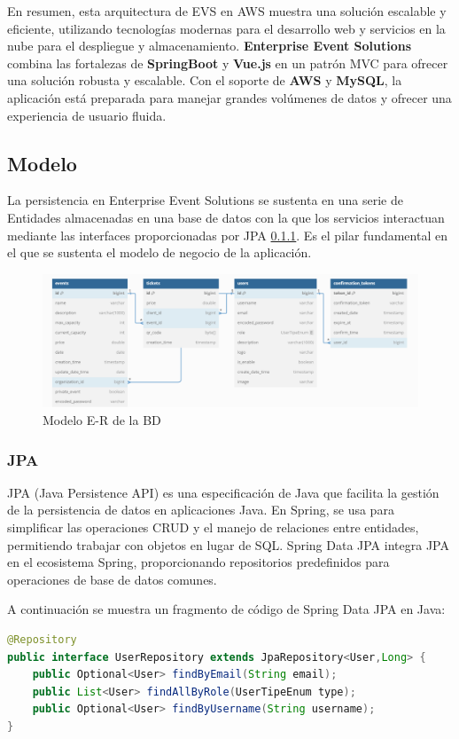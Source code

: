 En resumen, esta arquitectura de EVS en AWS muestra una solución escalable y eficiente, utilizando tecnologías modernas para el desarrollo web y servicios en la nube para el despliegue y almacenamiento. 
\textbf{Enterprise Event Solutions} combina las fortalezas de \textbf{SpringBoot} y \textbf{Vue.js} en un patrón MVC para ofrecer una solución robusta y 
escalable. Con el soporte de \textbf{AWS} y \textbf{MySQL}, la aplicación está preparada para manejar grandes volúmenes de datos y ofrecer una experiencia 
de usuario fluida.

\subsection{Modelo}
La persistencia en Enterprise Event Solutions se sustenta en una serie de Entidades almacenadas en una base de datos con la que los servicios interactuan mediante
las interfaces proporcionadas por JPA \ref{sec:jpa}. Es el pilar fundamental en el que se sustenta el modelo de negocio de la aplicación.
\begin{figure}[h]
    \centering
    \includegraphics[width=1.0\textwidth]{EVSdiagra.png} 
    \caption{Modelo E-R de la BD}
    \label{fig:diagramaBD}
\end{figure}

\subsubsection{JPA}
\label{sec:jpa}

JPA (Java Persistence API) es una especificación de Java que facilita la gestión de la persistencia de datos en aplicaciones Java.
En Spring, se usa para simplificar las operaciones CRUD y el manejo de relaciones entre entidades, permitiendo trabajar con objetos en lugar de SQL. 
Spring Data JPA integra JPA en el ecosistema Spring, proporcionando repositorios predefinidos para operaciones de base de datos comunes.

A continuación se muestra un fragmento de código de Spring Data JPA en Java:
\myjavastyle
\begin{lstlisting}[language=Java, caption=Ejemplo de Repositorio en Spring Data JPA, label=lst:jpacodigo]
@Repository
public interface UserRepository extends JpaRepository<User,Long> {
    public Optional<User> findByEmail(String email);
    public List<User> findAllByRole(UserTipeEnum type);
    public Optional<User> findByUsername(String username);
}
\end{lstlisting}

